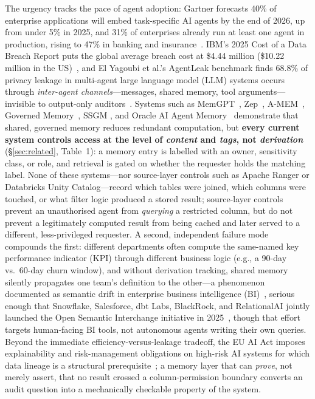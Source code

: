 \documentclass[nolineno]{ieeeaccess}
\begin{document}
The urgency tracks the pace of agent adoption: Gartner forecasts 40\% of
enterprise applications will embed task-specific AI agents by the end of
2026, up from under 5\% in 2025, and 31\% of enterprises already run at
least one agent in production, rising to 47\% in banking and
insurance~\cite{digitalapplied2026adoption}.
IBM's 2025 Cost of a Data Breach Report puts the global average breach cost
at \$4.44 million (\$10.22 million in the US)~\cite{ibm2025breach}, and El
Yagoubi et al.'s AgentLeak benchmark finds $68.8\%$ of privacy leakage in
multi-agent large language model (LLM) systems occurs through \emph{inter-agent channels}---messages,
shared memory, tool arguments---invisible to output-only
auditors~\cite{elyagoubi2026agentleak}.
Systems such as MemGPT~\cite{packer2023memgpt}, Zep~\cite{rasmussen2025zep},
A-MEM~\cite{xu2025amem}, Governed Memory~\cite{taheri2026governed}, SSGM
\cite{lam2026ssgm}, and Oracle AI Agent Memory~\cite{oracle2026memory}
demonstrate that shared, governed memory reduces redundant computation, but
\textbf{every current system controls access at the level of \emph{content}
and \emph{tags}, not \emph{derivation}} (\S\ref{sec:related}, Table~1): a
memory entry is labelled with an owner, sensitivity class, or role, and
retrieval is gated on whether the requester holds the matching label.
None of these systems---nor source-layer controls such as Apache Ranger or
Databricks Unity Catalog---record which tables were joined, which columns
were touched, or what filter logic produced a stored result; source-layer
controls prevent an unauthorised agent from \emph{querying} a restricted
column, but do not prevent a legitimately computed result from being cached
and later served to a different, less-privileged requester.
A second, independent failure mode compounds the first: different
departments often compute the same-named key performance indicator (KPI)
through different business
logic (e.g., a 90-day vs.\ 60-day churn window), and without derivation
tracking, shared memory silently propagates one team's definition to the
other---a phenomenon documented as semantic drift in enterprise business
intelligence (BI)~\cite{colrows2024metrics}, serious enough that Snowflake, Salesforce, dbt
Labs, BlackRock, and RelationalAI jointly launched the Open Semantic
Interchange initiative in 2025~\cite{snowflake2025osi}, though that effort
targets human-facing BI tools, not autonomous agents writing their own
queries.
Beyond the immediate efficiency-versus-leakage tradeoff, the EU AI Act
imposes explainability and risk-management obligations on high-risk AI
systems for which data lineage is a structural
prerequisite~\cite{euaiact2024}; a memory layer that can \emph{prove}, not
merely assert, that no result crossed a column-permission boundary converts
an audit question into a mechanically checkable property of the system.
\end{document}
